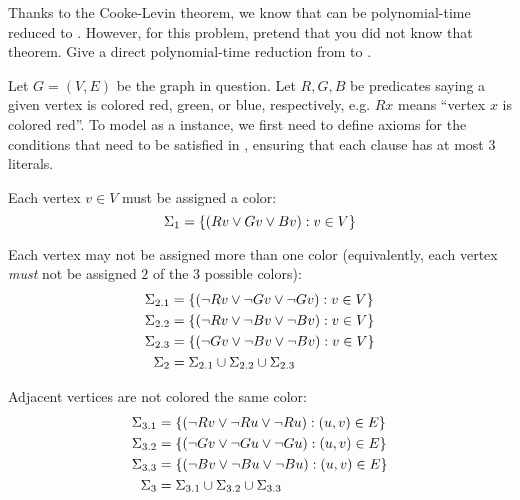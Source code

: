 \begin{problem}
  Thanks to the Cooke-Levin theorem, we know that
  \TColor can be polynomial-time reduced to \TSAT.
  However, for this problem, pretend that you did not know that theorem.
  Give a direct polynomial-time reduction from \TColor to \TSAT.
\end{problem}
\begin{Answer}
  Let $G = (V, E)$ be the graph in question.
  Let $R, G, B$ be predicates saying a given vertex is colored red, green,
  or blue, respectively, e.g. $Rx$ means ``vertex $x$ is colored red''.
  To model \TColor as a \TSAT instance, we first need to define axioms
  for the conditions that need to be satisfied in \TColor,
  ensuring that each clause has at most $3$ literals.

  \begin{enumroman}
    \item Each vertex $v \in V$ must be assigned a color:
      \[
        \Sigma_1 = \left\{ (Rv \lor Gv \lor Bv) : v \in V \right\}
      \]

    \item Each vertex may not be assigned more than one color
      (equivalently, each vertex \emph{must} not be assigned
      $2$ of the $3$ possible colors):
      \begin{align*}
        \Sigma_{2.1} &= \left\{ (\neg Rv \lor \neg Gv \lor \neg Gv) : v \in V \right\} \\
        \Sigma_{2.2} &= \left\{ (\neg Rv \lor \neg Bv \lor \neg Bv) : v \in V \right\} \\
        \Sigma_{2.3} &= \left\{ (\neg Gv \lor \neg Bv \lor \neg Bv) : v \in V \right\} \\
        \Sigma_2 &= \Sigma_{2.1} \cup \Sigma_{2.2} \cup \Sigma_{2.3}
      \end{align*}
    \item Adjacent vertices are not colored the same color:
      \begin{align*}
        \Sigma_{3.1} &= \left\{ (\neg Rv \lor \neg Ru \lor \neg Ru) : (u, v) \in E \right\} \\
        \Sigma_{3.2} &= \left\{ (\neg Gv \lor \neg Gu \lor \neg Gu) : (u, v) \in E \right\} \\
        \Sigma_{3.3} &= \left\{ (\neg Bv \lor \neg Bu \lor \neg Bu) : (u, v) \in E \right\} \\
        \Sigma_3 &= \Sigma_{3.1} \cup \Sigma_{3.2} \cup \Sigma_{3.3}
      \end{align*}
  \end{enumroman}


\end{Answer}
